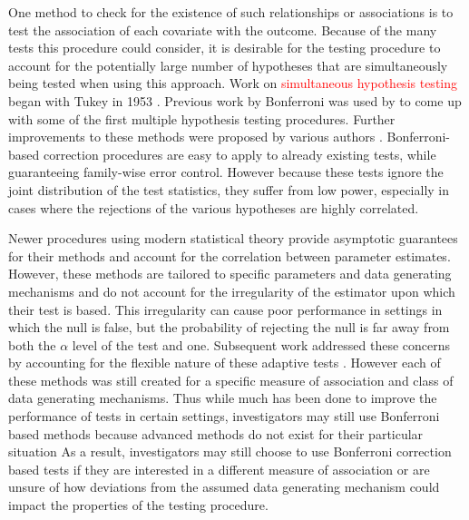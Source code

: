\documentclass{article}
\begin{document}
One method to check for the existence of such relationships or associations is to test the association of each covariate with the outcome. Because of the many tests this procedure could consider, it is desirable for the testing procedure to account for the potentially large number of hypotheses that are simultaneously being tested when using this approach. Work on \textcolor{red}{simultaneous hypothesis testing}
began with Tukey in 1953 \citep{miller_simultaneous_1981}.  Previous work by Bonferroni was used by \cite{dunn_estimation_1959,dunn_multiple_1961} to come up with some of the first multiple hypothesis testing procedures.  Further improvements to these methods were proposed by various authors \citep{hochberg_sharper_1988,holm_simple_1979,s._holland_improved_1988}.  Bonferroni-based correction procedures are easy to apply to already existing tests, while guaranteeing family-wise error control. However because these tests ignore the joint distribution of the test statistics, they suffer from low power, especially in cases where the rejections of the various hypotheses are highly correlated. 

Newer procedures using modern statistical theory provide asymptotic guarantees for their methods and account for the correlation between parameter estimates\citep[e.g.,][]{donoho_higher_2004}.  However, these methods are tailored to specific parameters and data generating mechanisms and do not account for the irregularity of the estimator upon which their test is based. This irregularity can cause poor performance in settings in which the null is false, but the probability of rejecting the null is far away from both the $\alpha$ level of the test and one.  Subsequent work addressed these concerns by accounting for the flexible nature of these adaptive tests \citep{mckeague_adaptive_2015, pan_powerful_2014, xu_adaptive_2016}.  However each of these methods was still created for a specific measure of association and class of data generating mechanisms. Thus while much has been done to improve the performance of tests in certain settings, investigators may still use Bonferroni based methods because advanced methods do not exist for their particular situation  As a result, investigators may still choose to use Bonferroni correction based tests if they are interested in a different measure of association or are unsure of how deviations from the assumed data generating mechanism could impact the properties of the testing procedure. 
\end{document}
